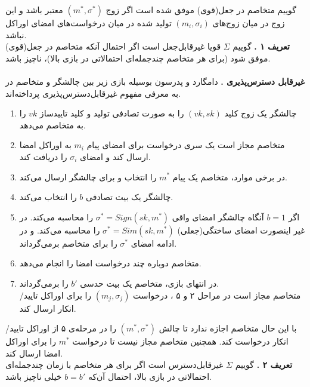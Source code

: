\documentclass[12pt,a4paper]{article}
\theoremstyle{plain}
\theoremstyle{definition}
\theoremstyle{remark}
\begin{document}
گوییم متخاصم در جعل(قوی) موفق شده است اگر زوج
$(m^*,\sigma^*)$
معتبر باشد و این زوج در میان زوج‌های 
$(m_i,\sigma_i)$
تولید شده در میان درخواست‌های امضای اوراکل نباشد.
\\
\textbf{تعریف ۱ .}
گوییم 
$\Sigma$
قویا غیرقابل‌جعل است اگر احتمال آنکه متخاصم در جعل(قوی) موفق شود (برای هر متخاصم چندجمله‌ای احتمالاتی در بازی بالا)، ناچیز باشد.
\\
\\
\textbf{غیرقابل دسترس‌پذیری . }
دامگارد و پدرسون بوسیله بازی زیر بین چالشگر و متخاصم در 
\cite{convertibleـundeniable}
به معرفی مفهوم غیرقابل‌دسترس‌پذیری پرداخته‌اند.
\begin{enumerate}
	
	\item 
	چالشگر یک زوج کلید
	$(vk,sk)$
	را به صورت تصادفی تولید و کلید تاییدساز 
	$vk$
	را به متخاصم می‌دهد.
	\item 
	متخاصم مجاز است یک سری درخواست برای امضای پیام
	$m_i$
	به اوراکل امضا ارسال کند و امضای
	$\sigma_i$
	را دریافت کند.
	\item 
	در برخی موارد، متخاصم یک پیام 
	$m^*$
	را انتخاب و برای چالشگر ارسال می‌کند.
	\item 
	چالشگر یک بیت تصادفی 
	$b$
	را انتخاب می‌کند.
	\item 
	اگر 
	$b = 1$
	آنگاه چالشگر امضای واقی
	$\sigma^* = Sign(sk,m^*)$
	را محاسبه می‌کند. در غیر اینصورت امضای ساختگی(جعلی) 
	$\sigma^* = Sim(sk,m^*)$
	را محاسبه می‌کند. و در ادامه امضای
	$\sigma^*$
	را برای متخاصم برمی‌گرداند.
	\item 
	متخاصم دوباره چند درخواست امضا را انجام می‌دهد.
	\item 
	در انتهای بازی، متخاصم یک بیت حدسی 
	$b'$
	را برمی‌گرداند.
	\\
	متخاصم مجاز است در مراحل ۲ و ۵ ، درخواست 
	$(m_j,\sigma_j)$
	را برای اوراکل تایید/انکار ارسال کند.
\end{enumerate}

با این حال متخاصم اجازه ندارد تا چالش 
$(m^*,\sigma^*)$
را در مرحله‌ی ۵ از اوراکل تایید/انکار درخواست کند. همچنین متخاصم مجاز نیست تا درخواست
$m^*$
را برای اوراکل امضا ارسال کند.
\\
\textbf{تعریف ۲ .}
گوییم
$\Sigma$
غیرقابل‌دسترس است اگر برای هر متخاصم با زمان چندجمله‌ای احتمالاتی در بازی بالا،‌  احتمال آن‌که 
$b = b'$
خیلی ناچیز باشد.
\end{document}
